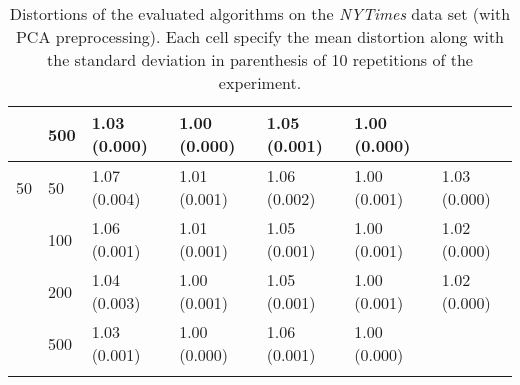 \begin{longtable}{lllllll}
   & 500 &  1.03 (0.000) &   1.00 (0.000) &  1.05 (0.001) &         1.00 (0.000) &  \\
 \midrule
50 & 50  &  1.07 (0.004) &   1.01 (0.001) &  1.06 (0.002) &         1.00 (0.001) &  1.03 (0.000) \\
   & 100 &  1.06 (0.001) &   1.01 (0.001) &  1.05 (0.001) &         1.00 (0.001) &  1.02 (0.000) \\
   & 200 &  1.04 (0.003) &   1.00 (0.001) &  1.05 (0.001) &         1.00 (0.001) &  1.02 (0.000) \\
   & 500 &  1.03 (0.001) &   1.00 (0.000) &  1.06 (0.001) &         1.00 (0.000) &            \\
\bottomrule
\caption{Distortions of the evaluated algorithms on the \textit{NYTimes} data set (with PCA preprocessing). Each cell specify the mean distortion along with the standard deviation in parenthesis of 10 repetitions of the experiment.}
\label{tab:distortions-mean-std-nytimes-pca}
\end{longtable}

